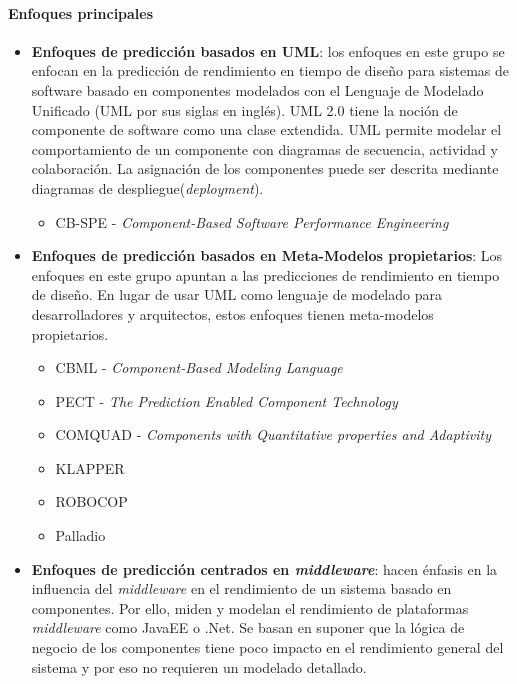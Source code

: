 \paragraph{Enfoques principales}
\begin{itemize}
    \item \textbf{Enfoques de predicción basados en UML}: los enfoques en este grupo se enfocan en la predicción de rendimiento en tiempo de diseño para sistemas de software basado en componentes modelados con el Lenguaje de Modelado Unificado (UML por sus siglas en inglés). UML 2.0 tiene la noción de componente de software como una clase extendida. UML permite modelar el comportamiento de un componente con diagramas de secuencia, actividad y colaboración. La asignación de los componentes puede ser descrita mediante diagramas de despliegue(\emph{deployment}).     
    \begin{itemize}
        \item CB-SPE - \emph{Component-Based Software Performance Engineering} 
    \end{itemize}
    \item \textbf{Enfoques de predicción basados en Meta-Modelos propietarios}: Los enfoques en este grupo apuntan a las predicciones de rendimiento en tiempo de diseño. En lugar de usar UML como lenguaje de modelado para desarrolladores y arquitectos, estos enfoques tienen meta-modelos propietarios\cite{Koziolek:2010:PEC:1808359.1808729}.
    \begin{itemize}
        \item CBML - \emph{Component-Based Modeling Language}
        \item PECT - \emph{The Prediction Enabled Component Technology}
        \item COMQUAD - \emph{Components with Quantitative properties and Adaptivity}
        \item KLAPPER
        \item ROBOCOP
        \item Palladio        
    \end{itemize}
    \item \textbf{Enfoques de predicción centrados en \emph{middleware}}: hacen énfasis en la influencia del \emph{middleware} en el rendimiento de un sistema basado en componentes. Por ello, miden y modelan el rendimiento de plataformas \emph{middleware} como JavaEE o .Net. Se basan en suponer que la lógica de negocio de los componentes tiene poco impacto en el rendimiento general del sistema y por eso no requieren un modelado detallado.

\end{itemize}
